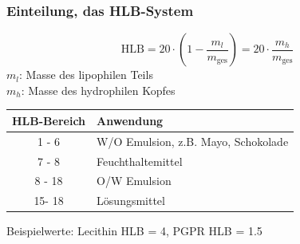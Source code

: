 \documentclass{beamer} %
\begin{document}
\begin{frame}
\frametitle{Einteilung, das HLB-System}
\begin{block}{}
\begin{equation}
\text{HLB} = 20 \cdot \left(1-\frac{m_l}{m_{\text{ges}}}\right) = 20 \cdot \frac{m_h}{m_{\text{ges}}}
\end{equation}
$m_l$: Masse des lipophilen Teils \\
$m_h$: Masse des hydrophilen Kopfes
\end{block}


\pause
\begin{table}[H]
   \centering
   \begin{tabular}{|c|l|}
   \hline
   HLB-Bereich & Anwendung \\
   \hline
   1 - 6 & W/O Emulsion, z.B. Mayo, Schokolade \\
   7 - 8 & Feuchthaltemittel \\
   8 - 18 & O/W Emulsion \\
   15- 18 & Lösungsmittel \\
   \hline   
   \end{tabular}
\end{table}%
\begin{block}{}
Beispielwerte: Lecithin HLB = 4, PGPR HLB = 1.5
\end{block}


\end{frame}
\end{document}
